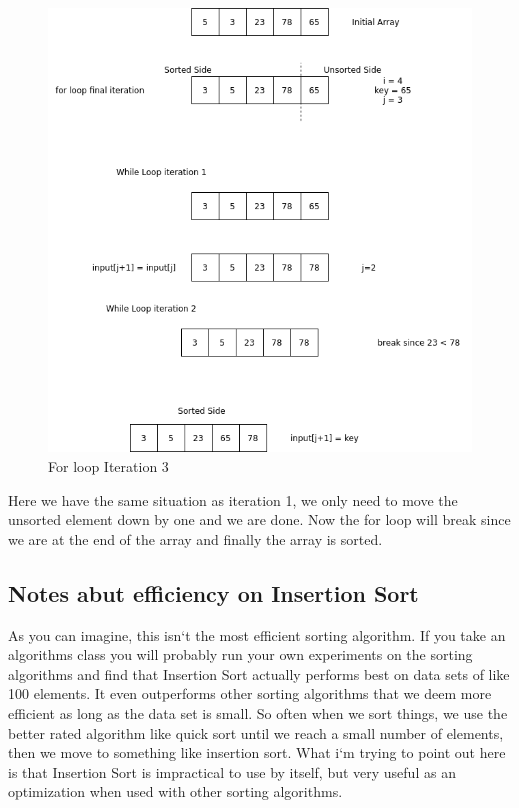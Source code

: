 \documentclass[11]{article}
\begin{document}
\begin{figure}[H]
	\centering
	\includegraphics[scale=0.75]{iteration4InsertionSort.png}
	\caption{For loop Iteration 3}
\end{figure}

Here we have the same situation as iteration 1, we only need to move the unsorted element down by one and we are done. Now the for loop will break since we are at the end of the array and finally the array is sorted.

\subsection{Notes abut efficiency on Insertion Sort}
As you can imagine, this isn`t the most efficient sorting algorithm. If you take an algorithms class you will probably run your own experiments on the sorting algorithms and find that Insertion Sort actually performs best on data sets of like 100 elements. It even outperforms other sorting algorithms that we deem more efficient as long as the data set is small. So often when we sort things, we use the better rated algorithm like quick sort until we reach a small number of elements, then we move to something like insertion sort. What i`m trying to point out here is that Insertion Sort is impractical to use by itself, but very useful as an optimization when used with other sorting algorithms.
\end{document}
